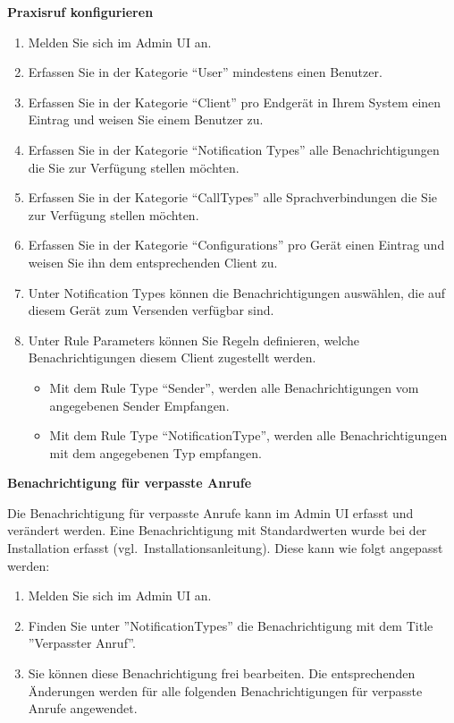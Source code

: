 \textbf{Praxisruf konfigurieren}
\begin{enumerate}
    \item Melden Sie sich im Admin UI an.
    \item Erfassen Sie in der Kategorie ``User'' mindestens einen Benutzer.
    \item Erfassen Sie in der Kategorie ``Client'' pro Endgerät in Ihrem System einen Eintrag und weisen Sie einem Benutzer zu.
    \item Erfassen Sie in der Kategorie ``Notification Types'' alle Benachrichtigungen die Sie zur Verfügung stellen möchten.
    \item Erfassen Sie in der Kategorie ``CallTypes'' alle Sprachverbindungen die Sie zur Verfügung stellen möchten.
    \item Erfassen Sie in der Kategorie ``Configurations'' pro Gerät einen Eintrag und weisen Sie ihn dem entsprechenden Client zu.
    \item Unter Notification Types können die Benachrichtigungen auswählen, die auf diesem Gerät zum Versenden verfügbar sind.
    \item Unter Rule Parameters können Sie Regeln definieren, welche Benachrichtigungen diesem Client zugestellt werden.

    \begin{itemize}
        \item Mit dem Rule Type ``Sender'', werden alle Benachrichtigungen vom angegebenen Sender Empfangen.
        \item Mit dem Rule Type ``NotificationType'', werden alle Benachrichtigungen mit dem angegebenen Typ empfangen.
    \end{itemize}
\end{enumerate}

\textbf{Benachrichtigung für verpasste Anrufe}

Die Benachrichtigung für verpasste Anrufe kann im Admin UI erfasst und verändert werden.
Eine Benachrichtigung mit Standardwerten wurde bei der Installation erfasst (vgl.\ Installationsanleitung).
Diese kann wie folgt angepasst werden:

\begin{enumerate}
    \item Melden Sie sich im Admin UI an.
    \item Finden Sie unter ''NotificationTypes'' die Benachrichtigung mit dem Title ''Verpasster Anruf''.
    \item Sie können diese Benachrichtigung frei bearbeiten.
    Die entsprechenden Änderungen werden für alle folgenden Benachrichtigungen für verpasste Anrufe angewendet.
\end{enumerate}

